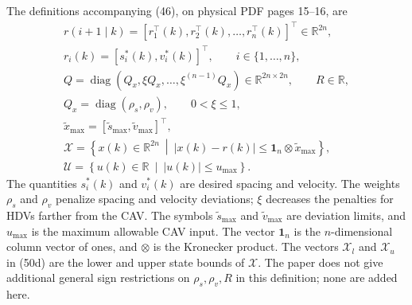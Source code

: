 \documentclass{article}
\begin{document}
The definitions accompanying (46), on physical PDF pages 15--16, are
\[
\begin{gathered}
r(i+1\mid k)=\left[r_1^\top(k),r_2^\top(k),\ldots,r_n^\top(k)\right]^\top\in\mathbb{R}^{2n},\\
r_i(k)=\left[s_i^*(k),v_i^*(k)\right]^\top,\qquad i\in\{1,\ldots,n\},\\
Q=\operatorname{diag}\left(Q_x,\xi Q_x,\ldots,\xi^{(n-1)}Q_x\right)\in\mathbb{R}^{2n\times2n},\qquad R\in\mathbb{R},\\
Q_x=\operatorname{diag}(\rho_s,\rho_v),\qquad 0<\xi\leq1,\\
\tilde{x}_{\max}=[\tilde{s}_{\max},\tilde{v}_{\max}]^\top,\\
\mathcal{X}=\left\{x(k)\in\mathbb{R}^{2n}\ \middle|\ |x(k)-r(k)|\leq\mathbf{1}_n\otimes\tilde{x}_{\max}\right\},\\
\mathcal{U}=\left\{u(k)\in\mathbb{R}\ \middle|\ |u(k)|\leq u_{\max}\right\}.
\end{gathered}
\]
The quantities $s_i^*(k)$ and $v_i^*(k)$ are desired spacing and velocity. The weights $\rho_s$ and $\rho_v$ penalize spacing and velocity deviations; $\xi$ decreases the penalties for HDVs farther from the CAV. The symbols $\tilde{s}_{\max}$ and $\tilde{v}_{\max}$ are deviation limits, and $u_{\max}$ is the maximum allowable CAV input. The vector $\mathbf{1}_n$ is the $n$-dimensional column vector of ones, and $\otimes$ is the Kronecker product. The vectors $\mathcal{X}_l$ and $\mathcal{X}_u$ in (50d) are the lower and upper state bounds of $\mathcal{X}$. The paper does not give additional general sign restrictions on $\rho_s,\rho_v,R$ in this definition; none are added here.
\end{document}
